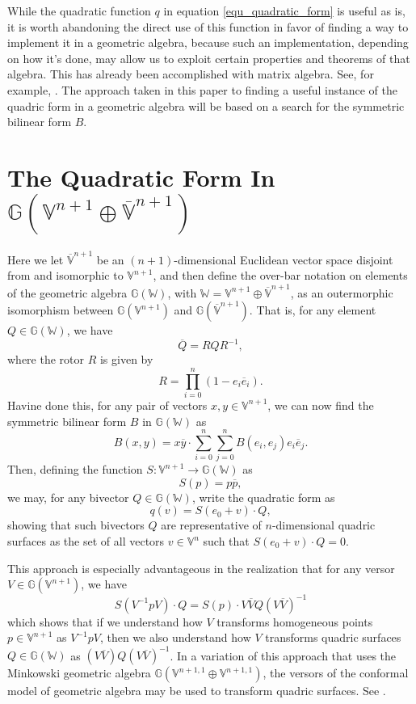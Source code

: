 \documentclass{birkjour}
\theoremstyle{definition}
\theoremstyle{remark}
\numberwithin{equation}{section}
\newcommand{\G}{\mathbb{G}}
\newcommand{\V}{\mathbb{V}}
\newcommand{\Vb}{\mathbb{\overline{V}}}
\newcommand{\W}{\mathbb{W}}
\begin{document}
While the quadratic function $q$ in equation \eqref{equ_quadratic_form} is useful as is, it is
worth abandoning the direct use of this function in favor of finding a way to implement it in
a geometric algebra, because
such an implementation, depending on how it's done, may allow us to exploit certain
properties and theorems of that algebra.
This has already been accomplished with matrix algebra.  See, for example, \cite{}.  The approach taken
in this paper to finding a useful instance of the quadric form in a geometric algebra will be based on
a search for the symmetric bilinear form $B$.

\section{The Quadratic Form In $\G(\V^{n+1}\oplus\Vb^{n+1})$}

Here we let $\Vb^{n+1}$ be an $(n+1)$-dimensional Euclidean vector space
disjoint from and isomorphic to $\V^{n+1}$, and then define the over-bar notation on elements
of the geometric algebra $\G(\W)$, with $\W=\V^{n+1}\oplus\Vb^{n+1}$, as an
outermorphic isomorphism between $\G(\V^{n+1})$ and $\G(\Vb^{n+1})$.
That is, for any element $Q\in\G(\W)$, we have
\begin{equation}
\overline{Q} = RQR^{-1},
\end{equation}
where the rotor $R$ is given by
\begin{equation}
R = \prod_{i=0}^n(1-e_i\overline{e}_i).
\end{equation}
Havine done this, for any pair of vectors $x,y\in\V^{n+1}$, we can now find
the symmetric bilinear form $B$ in $\G(\W)$ as
\begin{equation}
B(x,y) = x\overline{y}\cdot\sum_{i=0}^n\sum_{j=0}^n B(e_i,e_j)e_i\overline{e}_j.
\end{equation}
Then, defining the function $S:\V^{n+1}\to\G(\W)$ as
\begin{equation}
S(p) = p\overline{p},
\end{equation}
we may, for any bivector $Q\in\G(\W)$, write the quadratic form as
\begin{equation}\label{equ_quadric_form_in_ga}
q(v) = S(e_0+v)\cdot Q,
\end{equation}
showing that such bivectors $Q$ are representative of $n$-dimensional
quadric surfaces as the set of all vectors $v\in\V^n$ such that $S(e_0+v)\cdot Q=0$.

This approach is especially advantageous in the realization that for
any versor $V\in\G(\V^{n+1})$, we have
\begin{equation}
S(V^{-1}pV)\cdot Q=S(p)\cdot V\overline{V}Q(V\overline{V})^{-1}
\end{equation}
which shows that if we understand how $V$ transforms homogeneous
points $p\in\V^{n+1}$ as $V^{-1}pV$, then we also understand
how $V$ transforms quadric surfaces $Q\in\G(\W)$ as $(V\overline{V})Q(V\overline{V})^{-1}$.
In a variation of this approach that uses the Minkowski geometric algebra $\G(\V^{n+1,1}\oplus\V^{n+1,1})$,
the versors of the conformal model of geometric algebra may be used to transform quadric surfaces.
See \cite{}.
\end{document}
